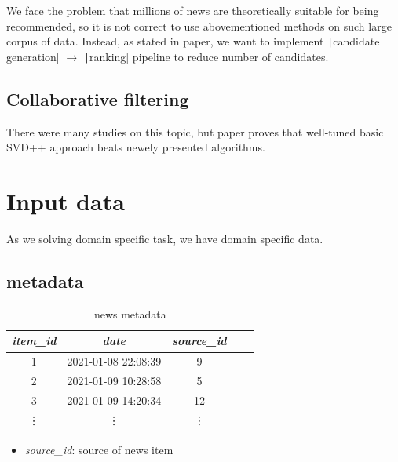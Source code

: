 \documentclass{article}
\begin{document}
    We face the problem that millions of news are theoretically suitable for being recommended, so it is not correct to use abovementioned methods on such large corpus of data. Instead, as stated in \citep{youtube} paper, we want to implement \texttt|candidate generation| $\to$ \texttt|ranking| pipeline to reduce number of candidates.



    \subsection{Collaborative filtering}

    There were many studies on this topic, but paper \citep{evaluation} proves that well-tuned basic SVD++ approach beats newely presented algorithms.



    \section{Input data}
    \label{sec:input}

    As we solving domain specific task, we have domain specific data.

    \subsection*{metadata}

    \begin{table}[h]
        \centering
        \begin{tabular}{ccccc}
            \toprule

            \emph{item\_id} & \emph{date} & \emph{source\_id} \\\midrule

            1 & 2021-01-08 22:08:39 & 9  \\
            2 & 2021-01-09 10:28:58 & 5  \\
            3 & 2021-01-09 14:20:34 & 12 \\
            \vdots & \vdots & \vdots  \\\bottomrule


         \hline
        \end{tabular}

        \caption{news metadata}
        \label{tab:meta}
    \end{table}

    
    \begin{itemize}
        \item \emph{source\_id}: source of news item
    \end{itemize}
\end{document}
